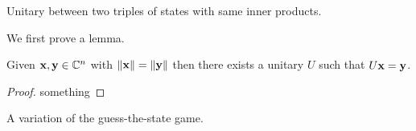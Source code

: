 \documentclass[boxes,pages]{homework}
\begin{document}
\begin{problem}
Unitary between two triples of states with same inner products.
\end{problem}

\begin{solution}
	We first prove a lemma.
	\begin{lemma}
		Given $\vb{x}, \vb{y}\in\mathbb{C}^n$ with $\norm{\vb{x}} = \norm{\vb{y}}$ then there exists a unitary $U$ such that $U\vb{x} = \vb{y}$.
	\end{lemma}
	\begin{proof}
		something
	\end{proof}
\end{solution}

\begin{problem}
A variation of the guess-the-state game.
\end{problem}

\begin{solution}
\end{solution}
\end{document}
